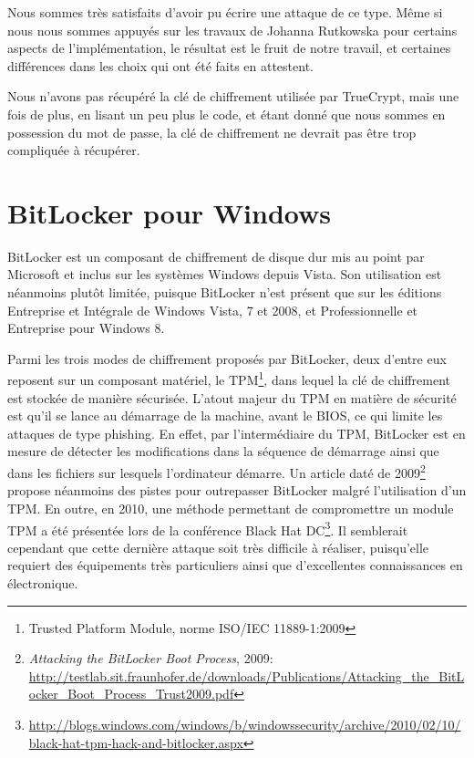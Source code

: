 \documentclass[12pt,a4paper]{article}
\begin{document}
Nous sommes très satisfaits d'avoir pu écrire une attaque de ce type. Même si
nous nous sommes appuyés sur les travaux de Johanna Rutkowska pour certains
aspects de l'implémentation, le résultat est le fruit de notre travail, et
certaines différences dans les choix qui ont été faits en attestent.

Nous n'avons pas récupéré la clé de chiffrement utilisée par TrueCrypt, mais une
fois de plus, en lisant un peu plus le code, et étant donné que nous sommes en 
possession du mot de passe, la clé de chiffrement ne devrait pas être trop 
compliquée à récupérer.


\section{BitLocker pour Windows}

BitLocker est un composant de chiffrement de disque dur mis au point par
Microsoft et inclus sur les systèmes Windows depuis Vista. Son utilisation est
néanmoins plutôt limitée, puisque BitLocker n'est présent que sur les éditions
Entreprise et Intégrale de Windows Vista, 7 et 2008, et Professionnelle et
Entreprise pour Windows 8.

Parmi les trois modes de chiffrement proposés par BitLocker, deux d'entre eux
reposent sur un composant matériel, le TPM\footnote{Trusted Platform Module,
norme ISO/IEC 11889-1:2009}, dans lequel la clé de chiffrement est stockée de
manière sécurisée. L'atout majeur du TPM en matière de sécurité est qu'il se
lance au démarrage de la machine, avant le BIOS, ce qui limite les attaques de
type phishing. En effet, par l'intermédiaire du TPM, BitLocker est en mesure de
détecter les modifications dans la séquence de démarrage ainsi que dans les
fichiers sur lesquels l'ordinateur démarre. Un article daté de
2009\footnote{\textit{Attacking the BitLocker Boot Process},
2009:\\\url{http://testlab.sit.fraunhofer.de/downloads/Publications/Attacking_the_BitLocker_Boot_Process_Trust2009.pdf}}
propose néanmoins des pistes pour outrepasser BitLocker malgré l'utilisation
d'un TPM. En outre, en 2010, une méthode permettant de compromettre un module
TPM a été présentée lors de la conférence Black Hat
DC\footnote{\url{http://blogs.windows.com/windows/b/windowssecurity/archive/2010/02/10/black-hat-tpm-hack-and-bitlocker.aspx}}.
Il semblerait cependant que cette dernière attaque soit très difficile à
réaliser, puisqu'elle requiert des équipements très particuliers ainsi que
d'excellentes connaissances en électronique.
\end{document}

